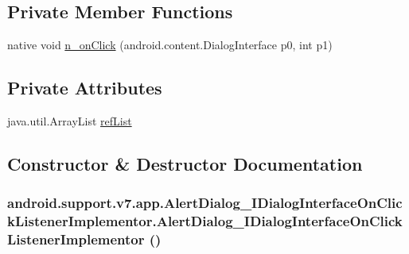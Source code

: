 \subsection*{Private Member Functions}
\begin{CompactItemize}
\item 
native void \hyperlink{classandroid_1_1support_1_1v7_1_1app_1_1_alert_dialog___i_dialog_interface_on_click_listener_implementor_876aebb98157d8d6875737d44b3272fc}{n\_\-onClick} (android.content.DialogInterface p0, int p1)
\end{CompactItemize}
\subsection*{Private Attributes}
\begin{CompactItemize}
\item 
java.util.ArrayList \hyperlink{classandroid_1_1support_1_1v7_1_1app_1_1_alert_dialog___i_dialog_interface_on_click_listener_implementor_0702810770fa11a2d9339a06dd84e5e2}{refList}
\end{CompactItemize}


\subsection{Constructor \& Destructor Documentation}
\hypertarget{classandroid_1_1support_1_1v7_1_1app_1_1_alert_dialog___i_dialog_interface_on_click_listener_implementor_4977a2096c2ca6fada156713257a3052}{
\subsubsection[{AlertDialog\_\-IDialogInterfaceOnClickListenerImplementor}]{\setlength{\rightskip}{0pt plus 5cm}android.support.v7.app.AlertDialog\_\-IDialogInterfaceOnClickListenerImplementor.AlertDialog\_\-IDialogInterfaceOnClickListenerImplementor ()}}
\label{classandroid_1_1support_1_1v7_1_1app_1_1_alert_dialog___i_dialog_interface_on_click_listener_implementor_4977a2096c2ca6fada156713257a3052}




